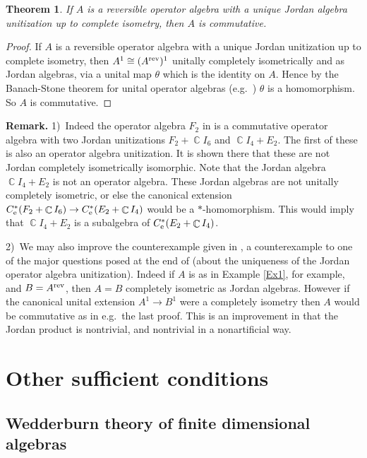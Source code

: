 \documentclass{amsart}
\newtheorem{theorem}{Theorem}[section]
\theoremstyle{remark}
\theoremstyle{definition}
\numberwithin{equation}{section}
\DeclareMathOperator{\Cdb}{{\mathbb C}}
\begin{document}
  \begin{theorem}  If $A$ is a reversible operator algebra with a unique Jordan algebra 
  unitization up to complete isometry, then  $A$ is commutative.      \end{theorem} 

  \begin{proof}  
 If $A$ is a reversible operator algebra with a unique Jordan unitization up to complete isometry, then 
 $A^1 \cong (A^{\rm rev})^1$ unitally completely isometrically and as Jordan algebras, via a unital map $\theta$ 
 which is the identity on $A$.  Hence by the 
 Banach-Stone theorem for unital operator algebras (e.g.\ \cite[Corollary 8.3.13]{BLM}) $\theta$ is a homomorphism.  So 
 $A$ is commutative. 
 \end{proof} 
 
 {\bf Remark.} 1)\ 
 Indeed the operator algebra $F_2$ in \cite[Proposition 2.1]{BWjr} is a 
commutative operator algebra with two Jordan unitizations $F_2 + \Cdb I_6$ and $\Cdb I_4 + E_2$.   The first of these is also an operator algebra unitization.  
It is shown there that these are not Jordan  completely isometrically isomorphic.  Note that the Jordan algebra
$\Cdb I_4 + E_2$ is not 
an operator algebra. These Jordan  algebras are not unitally completely isometric, or else the canonical 
extension $C^*_{\rm e}(F_2 + \Cdb I_6) \to C^*_{\rm e}(E_2 + \Cdb I_4)$ would be a $*$-homomorphism.
This would imply that $\Cdb I_4 + E_2$ is a subalgebra of $C^*_{\rm e}(E_2 + \Cdb I_4)$.

\medskip

 2)\ We may also improve the counterexample given in \cite[Section 2]{BWjr}, a counterexample  to one of the major questions posed at the end of 
 \cite{BWjmn} (about the uniqueness of the  Jordan operator algebra unitization).    Indeed if $A$ is as in Example \ref{Ex1}, for example, and $B = A^{\rm rev}$, then $A=B$ 
completely isometric as Jordan  algebras.  However if the canonical unital extension $A^1 \to B^1$ were 
a completely isometry then $A$ would be commutative as in e.g.\ the last proof.  This is an improvement in that the Jordan product is nontrivial, and nontrivial in a nonartificial way. 


\section{Other sufficient conditions}  \label{last}

\subsection{Wedderburn theory of finite dimensional algebras}
\end{document}
